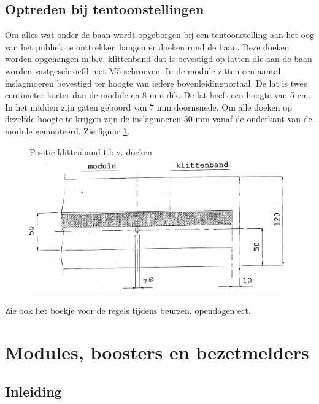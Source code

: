 \documentclass[12pt,a4paper]{report}
\begin{document}
\section{Optreden bij tentoonstellingen}

Om alles wat onder de baan wordt opgeborgen bij een tentoonstelling aan het oog van het publiek te onttrekken hangen er doeken rond de baan. Deze doeken worden opgehangen m.b.v. klittenband dat is bevestigd op latten die aan de baan worden vastgeschroefd met M5 schroeven. In de module zitten een aantal inslagmoeren bevestigd ter hoogte van iedere bovenleidingportaal. De lat is twee centimeter korter dan de module en 8 mm dik. De lat heeft een hoogte van 5 cm. In het midden zijn gaten geboord van 7 mm doornsnede. Om alle doeken op dezelfde hoogte te krijgen zijn de inslagmoeren 50 mm vanaf de onderkant van de module gemonteerd. Zie figuur \ref{figuur17}.

\begin{figure}[ht]
  \captionbox
  {Positie klittenband t.b.v. doeken\label{figuur17}}
  {\includegraphics[scale=0.4]{images/rcu_figuur17}}
\end{figure}

Zie ook het boekje voor de regels tijdens beurzen, opendagen ect.

\chapter{Modules, boosters en bezetmelders}
\label{ch:electronica}
\section{Inleiding}
\end{document}
